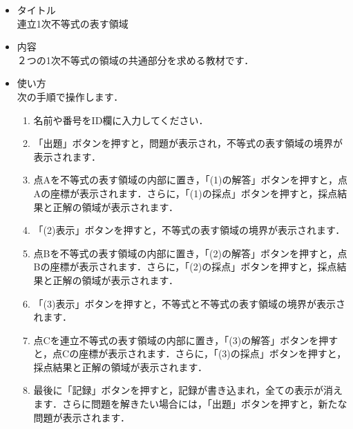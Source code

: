 \documentclass[20]{jarticle}
\begin{document}
\begin{itemize}
\item タイトル\\
連立1次不等式の表す領域

\item 内容\\
２つの1次不等式の領域の共通部分を求める教材です．

\item 使い方\\
次の手順で操作します．
\begin{enumerate}[(1)]
\item 名前や番号をID欄に入力してください．
\item 「出題」ボタンを押すと，問題が表示され，不等式の表す領域の境界が表示されます．
\item 点Aを不等式の表す領域の内部に置き，「(1)の解答」ボタンを押すと，点Aの座標が表示されます．さらに，「(1)の採点」ボタンを押すと，採点結果と正解の領域が表示されます．
\item 「(2)表示」ボタンを押すと，不等式の表す領域の境界が表示されます．
\item 点Bを不等式の表す領域の内部に置き，「(2)の解答」ボタンを押すと，点Bの座標が表示されます．さらに，「(2)の採点」ボタンを押すと，採点結果と正解の領域が表示されます．
\item 「(3)表示」ボタンを押すと，不等式と不等式の表す領域の境界が表示されます．
\item 点Cを連立不等式の表す領域の内部に置き，「(3)の解答」ボタンを押すと，点Cの座標が表示されます．さらに，「(3)の採点」ボタンを押すと，採点結果と正解の領域が表示されます．
\item 最後に「記録」ボタンを押すと，記録が書き込まれ，全ての表示が消えます．さらに問題を解きたい場合には，「出題」ボタンを押すと，新たな問題が表示されます．
\end{enumerate}

\end{itemize}
\end{document}
